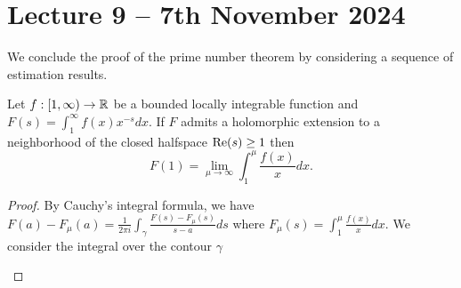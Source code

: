 \section{Lecture 9 -- 7th November 2024}\label{sec: lecture 9}
We conclude the proof of the prime number theorem by considering a sequence of estimation results. 
\begin{proposition}\label{prop: estimation result for bounded locally integrable function on closed half plane}
    Let $f:[1,\infty)\to\RR$ be a bounded locally integrable function and $F(s)=\int_{1}^{\infty}f(x)x^{-s}dx$. If $F$ admits a holomorphic extension to a neighborhood of the closed halfspace $\RE(s)\geq 1$ then 
    $$F(1)=\lim_{\mu\to\infty}\int_{1}^{\mu}\frac{f(x)}{x}dx.$$
\end{proposition}
\begin{proof}
    By Cauchy's integral formula, we have $F(a)-F_{\mu}(a)=\frac{1}{2\pi i}\int_{\gamma}\frac{F(s)-F_{\mu}(s)}{s-a}ds$ where $F_{\mu}(s)=\int_{1}^{\mu}\frac{f(x)}{x}dx$. We consider the integral over the contour $\gamma$
    \begin{center}

\begin{tikzpicture}[x=0.75pt,y=0.75pt,yscale=-1,xscale=1]


\end{tikzpicture}
\end{center}
\end{proof}
